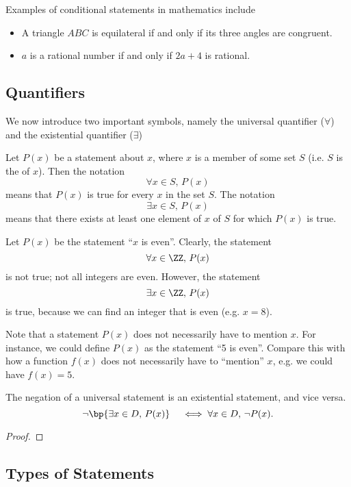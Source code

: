 Examples of conditional statements in mathematics include
\begin{itemize}
    \item A triangle $ABC$ is equilateral if and only if its three angles are congruent.
    \item $a$ is a rational number if and only if $2a + 4$ is rational.
\end{itemize}

\subsection{Quantifiers}

We now introduce two important symbols, namely the universal quantifier ($\forall$) and the existential quantifier ($\exists$)

\begin{definition}
    Let $P(x)$ be a statement about $x$, where $x$ is a member of some set $S$ (i.e. $S$ is the  of $x$). Then the notation \[\forall x \in S, \, P(x)\] means that $P(x)$ is true for every $x$ in the set $S$. The notation \[\exists x \in S, \, P(x)\] means that there exists at least one element of $x$ of $S$ for which $P(x)$ is true.
\end{definition}

\begin{example}
    Let $P(x)$ be the statement ``$x$ is even''. Clearly, the statement \[\forall x \in \ZZ, \, P(x)\] is not true; not all integers are even. However, the statement \[\exists x \in \ZZ, \, P(x)\] is true, because we can find an integer that is even (e.g. $x = 8$).
\end{example}

Note that a statement $P(x)$ does not necessarily have to mention $x$. For instance, we could define $P(x)$ as the statement ``5 is even''. Compare this with how a function $f(x)$ does not necessarily have to ``mention'' $x$, e.g. we could have $f(x) = 5$.

\begin{proposition}
    The negation of a universal statement is an existential statement, and vice versa. \[\lnot \bp{\exists x \in D, \, P(x)} \quad \iff \forall x \in D, \, \lnot P(x).\]
\end{proposition}
\begin{proof}
    
\end{proof}

\subsection{Types of Statements}


